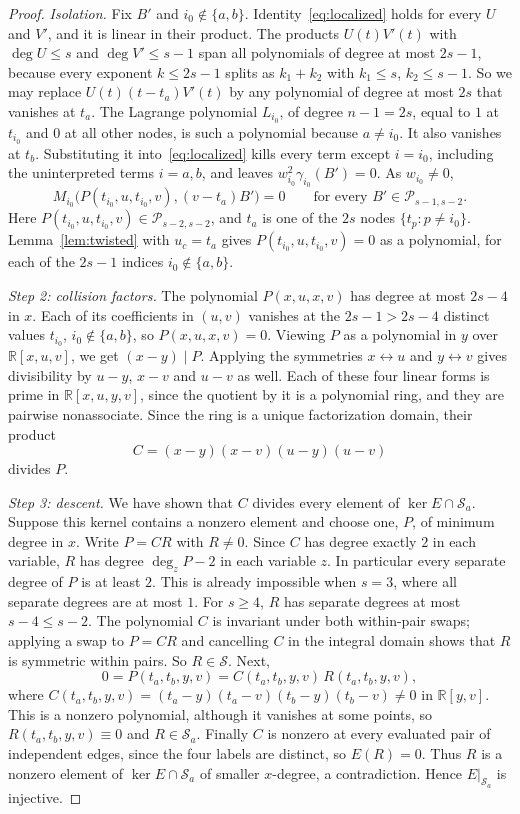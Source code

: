\documentclass[11pt,a4paper]{article}
\theoremstyle{definition}
\theoremstyle{remark}
\numberwithin{equation}{section}
\newcommand{\R}{\mathbb R}
\newcommand{\PP}{\mathcal P}
\newcommand{\SSS}{\mathcal S}
\begin{document}
\begin{proof}
\emph{Isolation.} Fix $B'$ and $i_0\notin\{a,b\}$. Identity~\eqref{eq:localized} holds for every $U$ and $V'$, and it is linear in their product. The products $U(t)V'(t)$ with $\deg U\le s$ and $\deg V'\le s-1$ span all polynomials of degree at most $2s-1$, because every exponent $k\le 2s-1$ splits as $k_1+k_2$ with $k_1\le s$, $k_2\le s-1$. So we may replace $U(t)(t-t_a)V'(t)$ by any polynomial of degree at most $2s$ that vanishes at $t_a$. The Lagrange polynomial $L_{i_0}$, of degree $n-1=2s$, equal to $1$ at $t_{i_0}$ and $0$ at all other nodes, is such a polynomial because $a\ne i_0$. It also vanishes at $t_b$. Substituting it into~\eqref{eq:localized} kills every term except $i=i_0$, including the uninterpreted terms $i=a,b$, and leaves $w_{i_0}^2\gamma_{i_0}(B')=0$. As $w_{i_0}\ne0$,
\[
M_{i_0}\bigl(P(t_{i_0},u,t_{i_0},v),(v-t_a)B'\bigr)=0\qquad\text{for every }B'\in\PP_{s-1,s-2}.
\]
Here $P(t_{i_0},u,t_{i_0},v)\in\PP_{s-2,s-2}$, and $t_a$ is one of the $2s$ nodes $\{t_p:p\ne i_0\}$. Lemma~\ref{lem:twisted} with $u_c=t_a$ gives $P(t_{i_0},u,t_{i_0},v)=0$ as a polynomial, for each of the $2s-1$ indices $i_0\notin\{a,b\}$.

\emph{Step 2: collision factors.} The polynomial $P(x,u,x,v)$ has degree at most $2s-4$ in $x$. Each of its coefficients in $(u,v)$ vanishes at the $2s-1>2s-4$ distinct values $t_{i_0}$, $i_0\notin\{a,b\}$, so $P(x,u,x,v)=0$. Viewing $P$ as a polynomial in $y$ over $\R[x,u,v]$, we get $(x-y)\mid P$. Applying the symmetries $x\leftrightarrow u$ and $y\leftrightarrow v$ gives divisibility by $u-y$, $x-v$ and $u-v$ as well. Each of these four linear forms is prime in $\R[x,u,y,v]$, since the quotient by it is a polynomial ring, and they are pairwise nonassociate. Since the ring is a unique factorization domain, their product
\[
C=(x-y)(x-v)(u-y)(u-v)
\]
divides $P$.

\emph{Step 3: descent.} We have shown that $C$ divides every element of $\ker E\cap\SSS_a$. Suppose this kernel contains a nonzero element and choose one, $P$, of minimum degree in $x$. Write $P=CR$ with $R\ne0$. Since $C$ has degree exactly $2$ in each variable, $R$ has degree $\deg_zP-2$ in each variable $z$. In particular every separate degree of $P$ is at least $2$. This is already impossible when $s=3$, where all separate degrees are at most $1$. For $s\ge4$, $R$ has separate degrees at most $s-4\le s-2$. The polynomial $C$ is invariant under both within-pair swaps; applying a swap to $P=CR$ and cancelling $C$ in the integral domain shows that $R$ is symmetric within pairs. So $R\in\SSS$. Next,
\[
0=P(t_a,t_b,y,v)=C(t_a,t_b,y,v)\,R(t_a,t_b,y,v),
\]
where $C(t_a,t_b,y,v)=(t_a-y)(t_a-v)(t_b-y)(t_b-v)\ne0$ in $\R[y,v]$. This is a nonzero polynomial, although it vanishes at some points, so $R(t_a,t_b,y,v)\equiv0$ and $R\in\SSS_a$. Finally $C$ is nonzero at every evaluated pair of independent edges, since the four labels are distinct, so $E(R)=0$. Thus $R$ is a nonzero element of $\ker E\cap\SSS_a$ of smaller $x$-degree, a contradiction. Hence $E|_{\SSS_a}$ is injective.


\end{proof}
\end{document}
